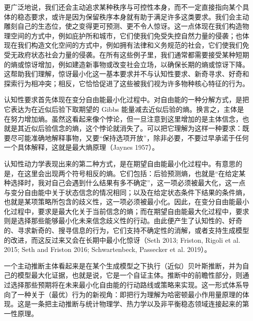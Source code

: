 更广泛地说，我们还会主动追求某种秩序与可控性本身，而不一定直接指向某个具体的稳态要求，或许是因为保留秩序本身就有助于满足许多这类要求。我们会主动雕刻自己的生态位，使之变得更可预测、更不令人惊讶。这一点体现在我们构造物理空间的方式中，例如庇护所和城市，它们使我们免受失控自然力量的侵袭；也体现在我们构造文化空间的方式中，例如拥有法律和义务规范的社会，它们使我们免受无政府状态社会力量的侵袭。在所有这些例子里，我们通常都需要接受某种短期的熵或惊讶增加，例如建造新事物或改变社会立场，以确保长期的熵或惊讶下降。这帮助我们理解，惊讶最小化这一基本要求并不与认知性要求、新奇寻求、好奇和探索行为相冲突；相反，它恰恰促进了这些被我们视为许多物种核心特征的行为。

认知性要求首先体现在变分自由能最小化过程中。对自由能的一种分解方式，是把它表达为在近似后验下取期望的 Gibbs 能量减去近似后验的熵。换言之，主体是在努力增加熵。虽然这看起来像个悖论，但一旦注意到这里增加的是主体信念，也就是其近似后验信念的熵，这个悖论就消失了。可以把它理解为这样一种要求：既要尽可能准确地解释事物，又要“保持选项开放”，除非必要，不要过早承诺于任何一个具体解释，这就是最大熵原理（Jaynes 1957）。

认知性动力学表现出来的第二种方式，是在期望自由能最小化过程中。有意思的是，在这里会出现两个符号相反的熵。它们包括：后验预测熵，也就是“在给定某种选择时，我对自己会遇到什么结果有多不确定”，这一项必须被最大化，这一点与变分自由能中关于状态信念的情况相同；以及在给定状态条件下结果的条件熵，也就是某项策略所包含的歧义性，这一项必须被最小化。因此，在变分自由能最小化过程中，要求是最大化关于当前信念的熵；而在期望自由能最大化过程中，要求则是选择那些能够最小化未来信念歧义性的行动。由此便产生了认知性的、好奇的、寻求新奇的、搜寻信息的行为，它们支持不确定性的消解，或者支持生成模型的改进，而这反过来又会在长期中最小化惊讶（Seth 2013; Friston, Rigoli et al. 2015; Seth and Friston 2016; Schwartenbeck, Passecker et al. 2019）。

一个主动推断主体看起来是在某个生成模型之下执行（近似）贝叶斯推断，并为自己的模型最大化证据，也就是说，它是一个自证主体。推断中的前瞻性部分，则通过选择那些预期将在未来最小化自由能的行动路线或策略来实现。这一形式体系导向了一种关于（最优）行为的新视角：即把行为理解为哈密顿最小作用量原理的体现。这是一条把主动推断与统计物理学、热力学以及非平衡稳态领域连接起来的第一性原理。
